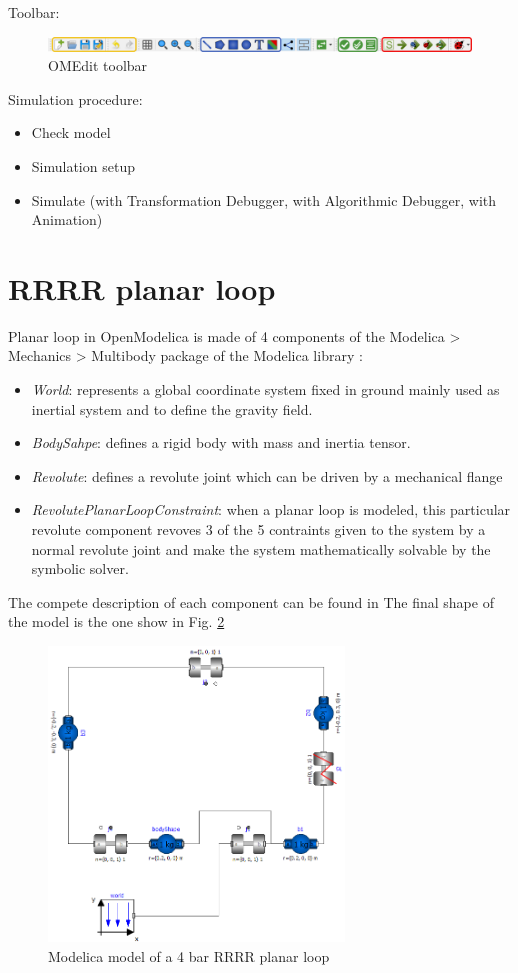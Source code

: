 Toolbar: 
\begin{figure}[H]
 \centering
 \includegraphics[width=\textwidth]{toolbar}
 \caption{OMEdit toolbar}
 \label{fig:omedit_toolbar}
\end{figure}

Simulation procedure:
\begin{itemize}
\itemsep 0em
\item Check model
\item Simulation setup
\item Simulate (with Transformation Debugger, with Algorithmic Debugger, with Animation)
\end{itemize}
\section{RRRR planar loop}
Planar loop in OpenModelica is made of 4 components of the Modelica > Mechanics > Multibody package of the Modelica library :
\begin{itemize}
\itemsep 0em
\item \textit{World}: represents a global coordinate system fixed in ground mainly used as inertial system and to define the gravity field.
\item \textit{BodySahpe}: defines a rigid body with mass and inertia tensor.
\item \textit{Revolute}: defines a revolute joint which can be driven by a mechanical flange
\item \textit{RevolutePlanarLoopConstraint}: when a planar loop is modeled, this particular revolute component revoves 3 of the 5 contraints given to the system by a normal revolute joint and make the system mathematically solvable by the symbolic solver.
\end{itemize}
The compete description of each component can be found in 
The final shape of the model is the one show in Fig. \ref{fig:rrrr_planarLoop}

\begin{figure}[H]
 \centering
 \includegraphics[width=0.7\textwidth]{rrrr_closedloop_model}
 \caption{Modelica model of a 4 bar RRRR planar loop}
 \label{fig:rrrr_planarLoop}
\end{figure}